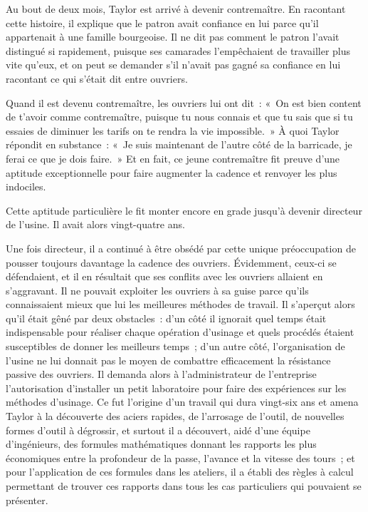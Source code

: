 \documentclass[french,twoside]{book} %
\begin{document}
Au bout de deux mois, Taylor est arrivé à devenir contremaître. En racontant cette histoire, il explique que le patron avait confiance en lui parce qu'il appartenait à une famille bourgeoise. Il ne dit pas comment le patron l'avait distingué si rapidement, puisque ses camarades l'empêchaient de travailler plus vite qu'eux, et on peut se demander s'il n'avait pas gagné sa confiance en lui racontant ce qui s'était dit entre ouvriers.\par
Quand il est devenu contremaître, les ouvriers lui ont dit : « On est bien content de t'avoir comme contremaître, puisque tu nous connais et que tu sais que si tu essaies de diminuer les tarifs on te rendra la vie impossible. » À quoi Taylor répondit en substance : « Je suis maintenant de l'autre côté de la barricade, je ferai ce que je dois faire. » Et en fait, ce jeune contremaître fit preuve d'une aptitude exceptionnelle pour faire augmenter la cadence et renvoyer les plus indociles.\par
Cette aptitude particulière le fit monter encore en grade jusqu'à devenir directeur de l'usine. Il avait alors vingt-quatre ans.\par
Une fois directeur, il a continué à être obsédé par cette unique préoccupation de pousser toujours davantage la cadence des ouvriers. Évidemment, ceux-ci se défendaient, et il en résultait que ses conflits avec les ouvriers allaient en s'aggravant. Il ne pouvait exploiter les ouvriers à sa guise parce qu'ils connaissaient mieux que lui les meilleures méthodes de travail. Il s'aperçut alors qu'il était gêné par deux obstacles : d'un côté il ignorait quel temps était indispensable pour réaliser chaque opération d'usinage et quels procédés étaient susceptibles de donner les meilleurs temps ; d'un autre côté, l'organisation de l'usine ne lui donnait pas le moyen de combattre efficacement la résistance passive des ouvriers. Il demanda alors à l'administrateur de l'entreprise l'autorisation d'installer un petit laboratoire pour faire des expériences sur les méthodes d'usinage. Ce fut l'origine d'un travail qui dura vingt-six ans et amena Taylor à la découverte des aciers rapides, de l'arrosage de l'outil, de nouvelles formes d'outil à dégrossir, et surtout il a découvert, aidé d'une équipe d'ingénieurs, des formules mathématiques donnant les rapports les plus économiques entre la profondeur de la passe, l'avance et la vitesse des tours ; et pour l'application de ces formules dans les ateliers, il a établi des règles à calcul permettant de trouver ces rapports dans tous les cas particuliers qui pouvaient se présenter.\par
\end{document}
